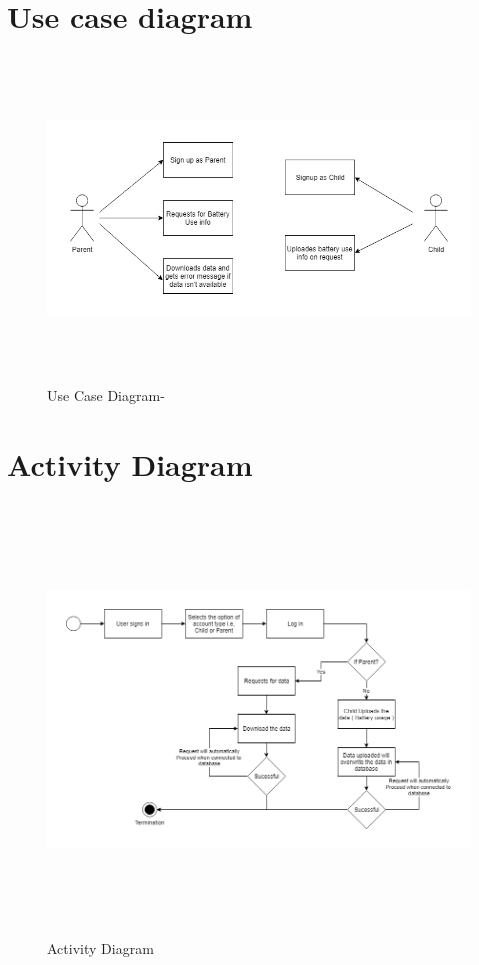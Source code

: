 \section{Use case diagram}
\vspace{1in}
\begin{figure}[!h]
	\centering
	\includegraphics[height=3.4in]{UseCase.PNG}
	\caption{Use Case Diagram-}
\end{figure}
\newpage
\section{Activity Diagram}
\begin{figure}[!h]
	\centering
	\includegraphics[height=4.5in]{Activity.PNG}
	\caption{Activity Diagram}
\end{figure}


